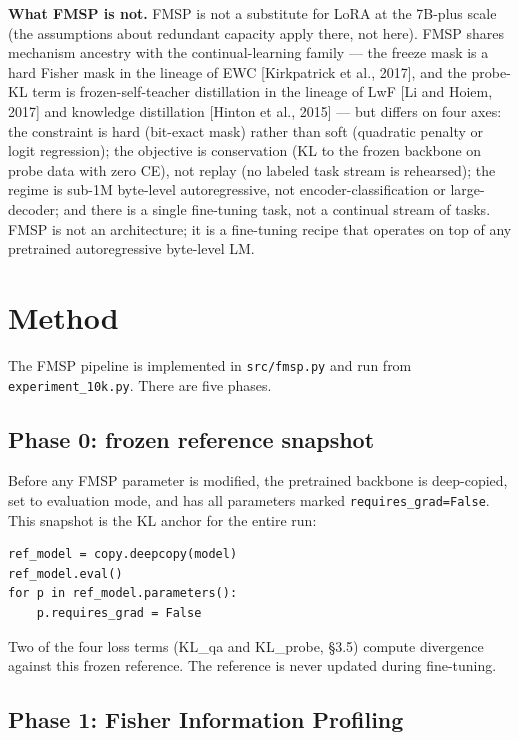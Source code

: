 \documentclass[11pt]{article}
\begin{document}
\textbf{What FMSP is not.} FMSP is not a substitute for LoRA at the 7B-plus scale (the assumptions about redundant capacity apply there, not here). FMSP shares mechanism ancestry with the continual-learning family --- the freeze mask is a hard Fisher mask in the lineage of EWC [Kirkpatrick et al., 2017], and the probe-KL term is frozen-self-teacher distillation in the lineage of LwF [Li and Hoiem, 2017] and knowledge distillation [Hinton et al., 2015] --- but differs on four axes: the constraint is hard (bit-exact mask) rather than soft (quadratic penalty or logit regression); the objective is conservation (KL to the frozen backbone on probe data with zero CE), not replay (no labeled task stream is rehearsed); the regime is sub-1M byte-level autoregressive, not encoder-classification or large-decoder; and there is a single fine-tuning task, not a continual stream of tasks. FMSP is not an architecture; it is a fine-tuning recipe that operates on top of any pretrained autoregressive byte-level LM.

\section{Method}

The FMSP pipeline is implemented in \texttt{src/fmsp.py} and run from \texttt{experiment\_10k.py}. There are five phases.

\subsection{Phase 0: frozen reference snapshot}

Before any FMSP parameter is modified, the pretrained backbone is deep-copied, set to evaluation mode, and has all parameters marked \texttt{requires\_grad=False}. This snapshot is the KL anchor for the entire run:

\begin{lstlisting}
ref_model = copy.deepcopy(model)
ref_model.eval()
for p in ref_model.parameters():
    p.requires_grad = False
\end{lstlisting}

Two of the four loss terms (KL\_qa and KL\_probe, \S3.5) compute divergence against this frozen reference. The reference is never updated during fine-tuning.

\subsection{Phase 1: Fisher Information Profiling}
\end{document}

